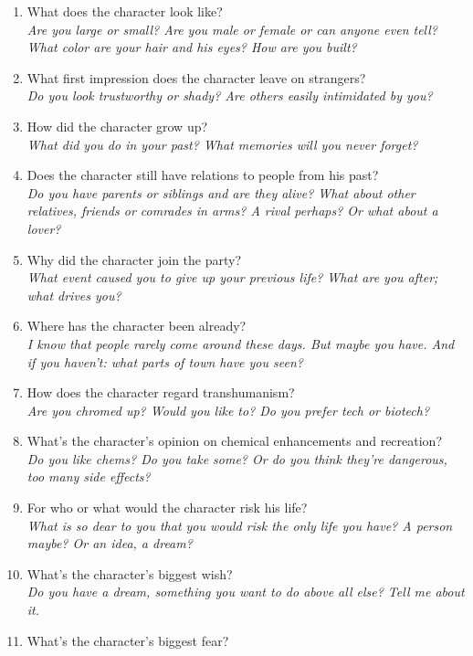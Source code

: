 \documentclass[12pt,a4paper,openany]{book}
\begin{document}
	\begin{enumerate}
		\setlength\itemsep{-6mm}
		\item What does the character look like?\\
			\textit{Are you large or small? Are you male or female or can anyone even tell? What color are your hair and his eyes? How are you built?}
		\item What first impression does the character leave on strangers?\\
			\textit{Do you look trustworthy or shady? Are others easily intimidated by you?}
		\item How did the character grow up?\\
			\textit{What did you do in your past? What memories will you never forget?}
		\item Does the character still have relations to people from his past?\\
			\textit{Do you have parents or siblings and are they alive? What about other relatives, friends or comrades in arms? A rival perhaps? Or what about a lover?}
		\item Why did the character join the party?\\
			\textit{What event caused you to give up your previous life? What are you after; what drives you?}
		\item Where has the character been already?\\
			\textit{I know that people rarely come around these days. But maybe you have. And if you haven't: what parts of town have you seen?}
		\item How does the character regard transhumanism?\\
			\textit{Are you chromed up? Would you like to? Do you prefer tech or biotech?}
		\item What’s the character’s opinion on chemical enhancements and recreation?\\
			\textit{Do you like chems? Do you take some? Or do you think they're dangerous, too many side effects?}
		\item For who or what would the character risk his life?\\
			\textit{What is so dear to you that you would risk the only life you have? A person maybe? Or an idea, a dream?}
		\item What’s the character’s biggest wish?\\
			\textit{Do you have a dream, something you want to do above all else? Tell me about it.}
		\item What’s the character’s biggest fear?\\

\end{enumerate}
\end{document}
